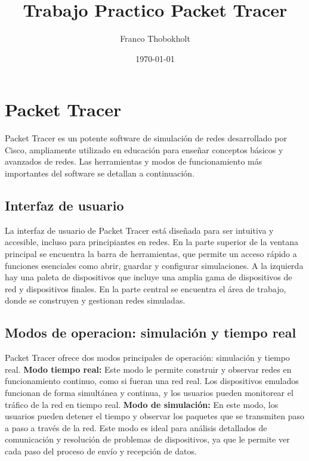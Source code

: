 \documentclass[a4paper,12pt]{article}
\title{Trabajo Practico Packet Tracer}
\author{Franco Thobokholt}
\date{\today}
\begin{document}
\maketitle

\section{Packet Tracer}
Packet Tracer es un potente software de simulación de redes desarrollado por Cisco, ampliamente utilizado en educación para enseñar conceptos básicos y avanzados de redes. Las herramientas y modos de funcionamiento más importantes del software se detallan a continuación.
\subsection{Interfaz de usuario}
La interfaz de usuario de Packet Tracer está diseñada para ser intuitiva y accesible, incluso para principiantes en redes. En la parte superior de la ventana principal se encuentra la barra de herramientas, que permite un acceso rápido a funciones esenciales como abrir, guardar y configurar simulaciones. A la izquierda hay una paleta de dispositivos que incluye una amplia gama de dispositivos de red y dispositivos finales. En la parte central se encuentra el área de trabajo, donde se construyen y gestionan redes simuladas.
\subsection{Modos de operacion: simulación y tiempo real}
Packet Tracer ofrece dos modos principales de operación: simulación y tiempo real.
\textbf{Modo tiempo real:} Este modo le permite construir y observar redes en funcionamiento continuo, como si fueran una red real. Los dispositivos emulados funcionan de forma simultánea y continua, y los usuarios pueden monitorear el tráfico de la red en tiempo real.
\textbf{Modo de simulación:} En este modo, los usuarios pueden detener el tiempo y observar los paquetes que se transmiten paso a paso a través de la red. Este modo es ideal para análisis detallados de comunicación y resolución de problemas de dispositivos, ya que le permite ver cada paso del proceso de envío y recepción de datos.
\end{document}
